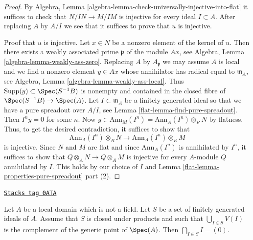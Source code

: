 \begin{proof}

By Algebra, Lemma \ref{algebra-lemma-check-universally-injective-into-flat}
it suffices to check that $N/IN \to M/IM$ is injective for every
ideal $I \subset A$. After replacing $A$ by $A/I$ we see that it suffices
to prove that $u$ is injective.

\medskip\noindent
Proof that $u$ is injective. Let $x \in N$ be a nonzero element of the
kernel of $u$. Then there exists a weakly associated prime $\mathfrak p$
of the module $Ax$, see Algebra, Lemma \ref{algebra-lemma-weakly-ass-zero}.
Replacing $A$ by $A_\mathfrak p$ we may assume $A$ is local and
we find a nonzero element $y \in Ax$ whose annihilator has radical
equal to $\mathfrak m_A$, see
Algebra, Lemma \ref{algebra-lemma-weakly-ass-local}.
Thus $\text{Supp}(y) \subset \Spec(S^{-1}B)$ is nonempty and
contained in the closed fibre of $\Spec(S^{-1}B) \to \Spec(A)$.
Let $I \subset \mathfrak m_A$ be a
finitely generated ideal so that we have a pure spreadout over $A/I$, see
Lemma \ref{flat-lemma-find-pure-spreadout}. Then $I^n y = 0$ for some $n$. Now
$y \in \text{Ann}_M(I^n) = \text{Ann}_A(I^n) \otimes_R N$ by flatness.
Thus, to get the desired contradiction, it suffices to show that
$$
\text{Ann}_A(I^n) \otimes_R N
\longrightarrow
\text{Ann}_A(I^n) \otimes_R M
$$
is injective. Since $N$ and $M$ are flat and since $\text{Ann}_A(I^n)$
is annihilated by $I^n$, it suffices to show that
$Q \otimes_A N \to Q \otimes_A M$ is injective for every $A$-module
$Q$ annihilated by $I$. This holds by our choice of $I$ and
Lemma \ref{flat-lemma-properties-pure-spreadout} part (2).
\end{proof}

\begin{lemma}
\label{flat-lemma-big-intersection-is-zero}
\href{https://stacks.math.columbia.edu/tag/0ATA}{\texttt{Stacks tag 0ATA}}

Let $A$ be a local domain which is not a field.
Let $S$ be a set of finitely generated ideals of $A$.
Assume that $S$ is closed under products and such that
$\bigcup_{I \in S} V(I)$ is the complement of the generic point of $\Spec(A)$.
Then $\bigcap_{I \in S} I = (0)$.
\end{lemma}

